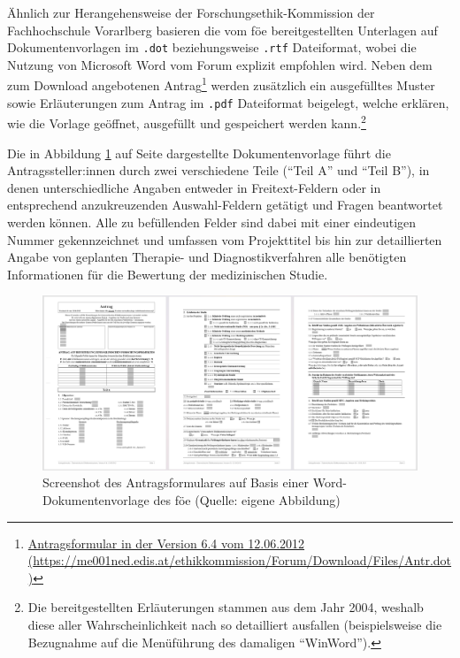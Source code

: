 Ähnlich zur Herangehensweise der Forschungsethik-Kommission der Fachhochschule Vorarlberg basieren die vom \ac{föe} bereitgestellten Unterlagen auf Dokumentenvorlagen im \texttt{.dot} beziehungsweise \texttt{.rtf} Dateiformat, wobei die Nutzung von Microsoft Word vom Forum explizit empfohlen wird. Neben dem zum Download angebotenen Antrag\footnote{\href{https://me001ned.edis.at/ethikkommission/Forum/Download/Files/Antr.dot}{Antragsformular in der Version 6.4 vom 12.06.2012 (\url{https://me001ned.edis.at/ethikkommission/Forum/Download/Files/Antr.dot})}} werden zusätzlich ein ausgefülltes Muster sowie Erläuterungen zum Antrag im \texttt{.pdf} Dateiformat beigelegt, welche erklären, wie die Vorlage geöffnet, ausgefüllt und gespeichert werden kann.\footnote{Die bereitgestellten Erläuterungen stammen aus dem Jahr 2004, weshalb diese aller Wahrscheinlichkeit nach so detailliert ausfallen (beispielsweise die Bezugnahme auf die Menüführung des damaligen \enquote{WinWord}).} \cite{ethikkommission_der_medizinischen_universitat_graz_download_2012}

Die in Abbildung \ref{fig:dokumentenvorlage-föe} auf Seite \pageref{fig:dokumentenvorlage-föe} dargestellte Dokumentenvorlage führt die Antragssteller:innen durch zwei verschiedene Teile (\enquote{Teil A} und \enquote{Teil B}), in denen unterschiedliche Angaben entweder in Freitext-Feldern oder in entsprechend anzukreuzenden Auswahl-Feldern getätigt und Fragen beantwortet werden können. Alle zu befüllenden Felder sind dabei mit einer eindeutigen Nummer gekennzeichnet und umfassen vom Projekttitel bis hin zur detaillierten Angabe von geplanten Therapie- und Diagnostikverfahren alle benötigten Informationen für die Bewertung der medizinischen Studie.

\begin{figure}[ht]
    \centering
    \includegraphics[scale=0.21]{thesis/images/Luidold_Word-Vorlage-Forum-Oesterreichischer-Ethikkommissionen.png}
    \caption[Screenshot der Word-Dokumentenvorlage des Forums Österreichischer Ethikkommissionen]{Screenshot des Antragsformulares auf Basis einer Word-Dokumentenvorlage des \ac{föe} (Quelle: eigene Abbildung)}
    \label{fig:dokumentenvorlage-föe}
\end{figure}

